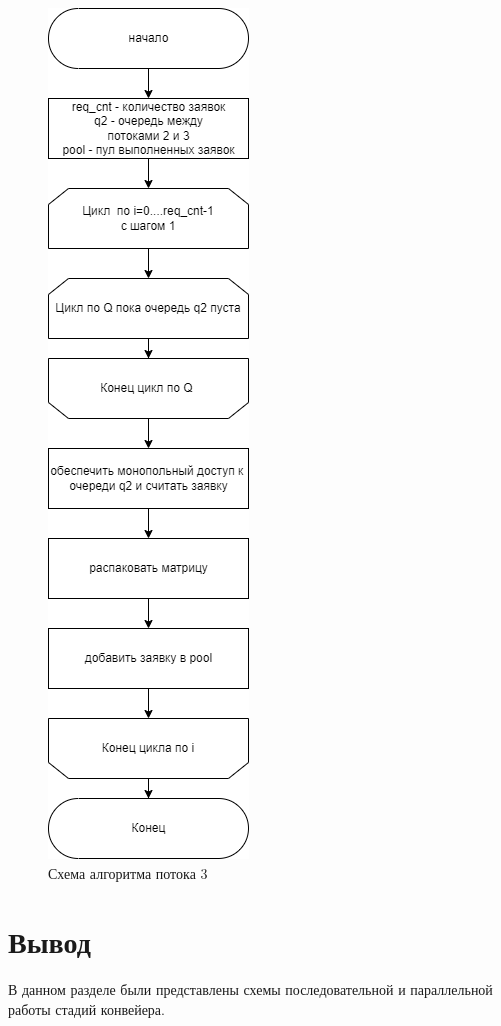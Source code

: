 \begin{figure}[h]
	\centering
	\includegraphics[height=0.85\textheight]{img/unpack.png}
	\caption{Схема алгоритма потока 3}
	\label{fig:unpack}
\end{figure}

\clearpage

\section*{Вывод}
В данном разделе были представлены схемы последовательной и параллельной работы стадий конвейера.